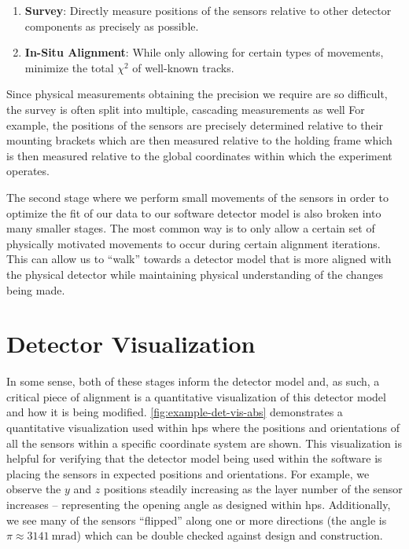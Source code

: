 \begin{enumerate}
  \item \textbf{Survey}: Directly measure positions of the sensors relative to other
        detector components as precisely as possible.
  \item \textbf{In-Situ Alignment}: While only allowing for certain types of movements,
        minimize the total $\chi^2$ of well-known tracks.
\end{enumerate}

Since physical measurements obtaining the precision we require are so difficult, the survey is
often split into multiple, cascading measurements as well For example, the positions of the sensors
are precisely determined relative to their mounting brackets which are then measured relative to
the holding frame which is then measured relative to the global coordinates within which the
experiment operates.

The second stage where we perform small movements of the sensors in order to optimize the fit of
our data to our software detector model is also broken into many smaller stages. The most common
way is to only allow a certain set of physically motivated movements to occur during certain
alignment iterations. This can allow us to ``walk'' towards a detector model that is more aligned
with the physical detector while maintaining physical understanding of the changes being made.

\section{Detector Visualization}

In some sense, both of these stages inform the detector model and, as such, a critical piece of
alignment is a quantitative visualization of this detector model and how it is being modified.
\cref{fig:example-det-vis-abs} demonstrates a quantitative visualization used within \ac{hps} where
the positions and orientations of all the sensors within a specific coordinate system are shown.
This visualization is helpful for verifying that the detector model being used within the software
is placing the sensors in expected positions and orientations. For example, we observe the $y$ and
$z$ positions steadily increasing as the layer number of the sensor increases -- representing the
opening angle as designed within \ac{hps}. Additionally, we see many of the sensors ``flipped''
along one or more directions (the angle is $\pi \approx \qty{3141}{\milli\radian}$) which can be
double checked against design and construction.

